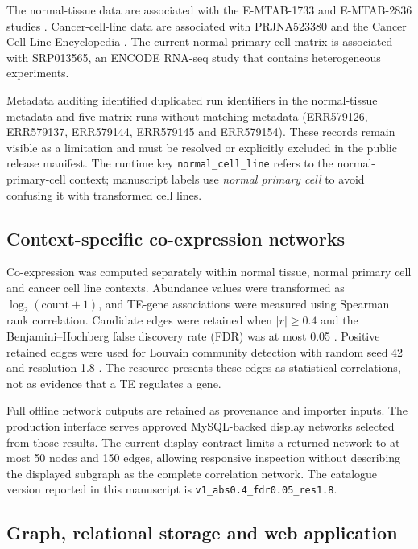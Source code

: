 The normal-tissue data are associated with the E-MTAB-1733 and E-MTAB-2836 studies \citep{Edqvist2015SkinTranscriptome,Uhlen2015HumanProteome}. Cancer-cell-line data are associated with PRJNA523380 and the Cancer Cell Line Encyclopedia \citep{Ghandi2019CCLE}. The current normal-primary-cell matrix is associated with SRP013565, an ENCODE RNA-seq study that contains heterogeneous experiments. 

Metadata auditing identified duplicated run identifiers in the normal-tissue metadata and five matrix runs without matching metadata (ERR579126, ERR579137, ERR579144, ERR579145 and ERR579154). These records remain visible as a limitation and must be resolved or explicitly excluded in the public release manifest. The runtime key \texttt{normal\_cell\_line} refers to the normal-primary-cell context; manuscript labels use \emph{normal primary cell} to avoid confusing it with transformed cell lines.

\subsection{Context-specific co-expression networks}

Co-expression was computed separately within normal tissue, normal primary cell and cancer cell line contexts. Abundance values were transformed as $\log_{2}(\mathrm{count}+1)$, and TE-gene associations were measured using Spearman rank correlation. Candidate edges were retained when $|r| \geq 0.4$ and the Benjamini--Hochberg false discovery rate (FDR) was at most 0.05 \citep{Benjamini1995FDR}. Positive retained edges were used for Louvain community detection with random seed 42 and resolution 1.8 \citep{Blondel2008Louvain}. The resource presents these edges as statistical correlations, not as evidence that a TE regulates a gene.

Full offline network outputs are retained as provenance and importer inputs. The production interface serves approved MySQL-backed display networks selected from those results. The current display contract limits a returned network to at most 50 nodes and 150 edges, allowing responsive inspection without describing the displayed subgraph as the complete correlation network. The catalogue version reported in this manuscript is \texttt{v1\_abs0.4\_fdr0.05\_res1.8}.

\subsection{Graph, relational storage and web application}


